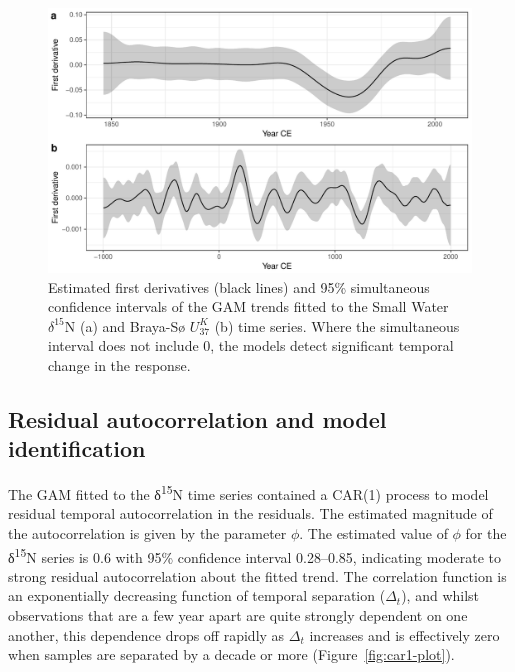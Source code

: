 \documentclass[12pt,]{article}
\newcommand{\uk}{\ensuremath{\mathit{U}^{\mathit{K}}_{\mathup{37}}}}
\begin{document}
\begin{figure}

{\centering \includegraphics[width=0.8\linewidth]{manuscript_files/figure-latex/derivatives-1} 

}

\caption{Estimated first derivatives (black lines) and 95\% simultaneous confidence intervals of the GAM trends fitted to the Small Water $\delta^{15}\text{N}$ (a) and Braya-Sø \uk{} (b) time series. Where the simultaneous interval does not include 0, the models detect significant temporal change in the response.}\label{fig:derivatives}
\end{figure}

\hypertarget{identifiability}{\subsection{Residual autocorrelation and
model identification}\label{identifiability}}

The GAM fitted to the δ\textsuperscript{15}N time series contained a
CAR(1) process to model residual temporal autocorrelation in the
residuals. The estimated magnitude of the autocorrelation is given by
the parameter \(\phi\). The estimated value of \(\phi\) for the
δ\textsuperscript{15}N series is 0.6 with 95\% confidence interval
0.28--0.85, indicating moderate to strong residual autocorrelation about
the fitted trend. The correlation function is an exponentially
decreasing function of temporal separation (\(\Delta_t\)), and whilst
observations that are a few year apart are quite strongly dependent on
one another, this dependence drops off rapidly as \(\Delta_t\) increases
and is effectively zero when samples are separated by a decade or more
(Figure~\ref{fig:car1-plot}).
\end{document}
